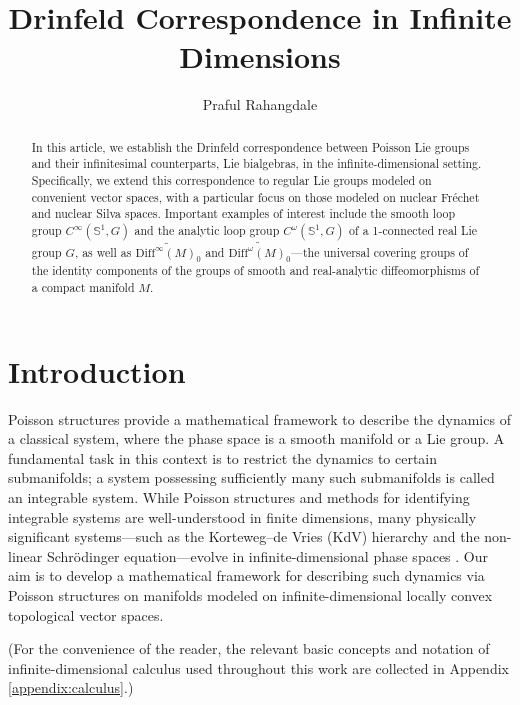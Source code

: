 \documentclass[11pt,reqno]{amsart}
\title[Drinfeld Correspondence in Infinite-Dimension]{Drinfeld Correspondence in Infinite Dimensions}
\author{Praful Rahangdale}
\theoremstyle{definition}
\numberwithin{equation}{section}
\begin{document}
 \begin{abstract}
 In this article, we establish the Drinfeld correspondence between Poisson Lie groups and their infinitesimal counterparts, Lie bialgebras, in the infinite-dimensional setting. Specifically, we extend this correspondence to regular Lie groups modeled on convenient vector spaces, with a particular focus on those modeled on nuclear Fr\'{e}chet and nuclear Silva spaces. Important examples of interest include the smooth loop group $C^{\infty}(\mathbb{S}^{1}, G)$ and the analytic loop group $C^{\omega}(\mathbb{S}^{1}, G)$ of a 1-connected real Lie group $G$, as well as $\widetilde{\mathrm{Diff}^{\infty}(M)_0}$ and $\widetilde{\mathrm{Diff}^{\omega}(M)_0}$---the universal covering groups of the identity components of the groups of smooth and real-analytic diffeomorphisms of a compact manifold $M$.
 \end{abstract}
\maketitle

\tableofcontents



\section{Introduction}

Poisson structures provide a mathematical framework to describe the dynamics of a classical system, where the phase space is a smooth manifold or a Lie group. A fundamental task in this context is to restrict the dynamics to certain submanifolds; a system possessing sufficiently many such submanifolds is called an integrable system. While Poisson structures and methods for identifying integrable systems are well-understood in finite dimensions, many physically significant systems—such as the Korteweg--de Vries (KdV) hierarchy and the non-linear Schrödinger equation—evolve in infinite-dimensional phase spaces \cite{9, 10, 16, 19}. Our aim is to develop a mathematical framework for describing such dynamics via Poisson structures on manifolds modeled on infinite-dimensional locally convex topological vector spaces.

(For the convenience of the reader, the relevant basic concepts and notation of infinite-dimensional calculus used throughout this work are collected in Appendix \ref{appendix:calculus}.)
\end{document}
